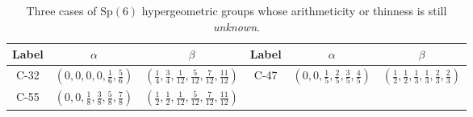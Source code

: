 \documentclass[11pt,a4paper]{amsart}
\theoremstyle{definition}
\theoremstyle{definition}
\numberwithin{equation}{section}
\newcommand{\Sp}{\mathrm{Sp}}
\begin{document}
{\centering
\scriptsize\renewcommand{\arraystretch}{2}
\begin{longtable}{|c|c|c|||c|c|c|}
\caption{Three cases of $\Sp(6)$ hypergeometric groups whose arithmeticity or thinness is still \emph{unknown}.}\label{tab:open}\\\hline
Label & $\alpha$ & $\beta$ & Label & $\alpha$ & $\beta$\\\hline\hline
C-32 & $\left(0,0,0,0,\frac{1}{6},\frac{5}{6}\right)$&$\left(\frac{1}{4},\frac{3}{4},\frac{1}{12},\frac{5}{12},\frac{7}{12},\frac{11}{12}\right)$ &
C-47 &$\left(0,0,\frac{1}{5},\frac{2}{5},\frac{3}{5},\frac{4}{5}\right)$ & $\left(\frac{1}{2},\frac{1}{2},\frac{1}{3},\frac{1}{3},\frac{2}{3},\frac{2}{3}\right)$ \\\hline
C-55 &$\left(0,0,\frac{1}{8},\frac{3}{8},\frac{5}{8},\frac{7}{8}\right)$ & $\left(\frac{1}{2},\frac{1}{2},\frac{1}{12},\frac{5}{12},\frac{7}{12},\frac{11}{12}\right)$ & & &\\\hline
\end{longtable}}
\end{document}
